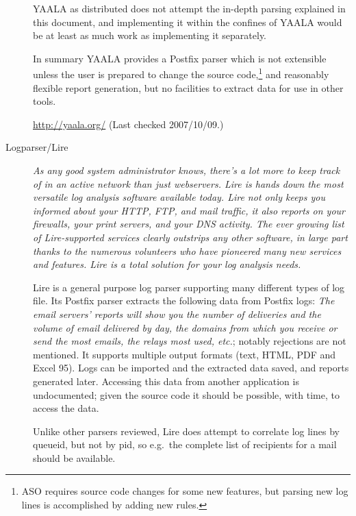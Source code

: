 \documentclass[a4paper,12pt,draft]{article}
\newcommand{\parsername}{ASO}
\begin{document}
\begin{description}
        YAALA as distributed does not attempt the in-depth parsing
        explained in this document, and implementing it within the confines
        of YAALA would be at least as much work as implementing it
        separately.

        In summary YAALA provides a Postfix parser which is not extensible
        unless the user is prepared to change the source
        code,\footnote{\parsername{} requires source code changes for some
        new features, but parsing new log lines is accomplished by adding
        new rules.} and reasonably flexible report generation, but no
        facilities to extract data for use in other tools.

        \url{http://yaala.org/} \newline (Last checked 2007/10/09.)

    \item [Logparser/Lire] \textit{As any good system administrator knows,
        there's a lot more to keep track of in an active network than just
        webservers. Lire is hands down the most versatile log analysis
        software available today. Lire not only keeps you informed about
        your HTTP, FTP, and mail traffic, it also reports on your
        firewalls, your print servers, and your DNS activity. The ever
        growing list of Lire-supported services clearly outstrips any other
        software, in large part thanks to the numerous volunteers who have
        pioneered many new services and features. Lire is a total solution
        for your log analysis needs.\/}

        Lire is a general purpose log parser supporting many different
        types of log file.  Its Postfix parser extracts the following data
        from Postfix logs: \textit{The email servers' reports will show you
        the number of deliveries and the volume of email delivered by day,
        the domains from which you receive or send the most emails, the
        relays most used, etc.\/}; notably rejections are not mentioned.
        It supports multiple output formats (text, HTML, PDF and Excel 95).
        Logs can be imported and the extracted data saved, and reports
        generated later.  Accessing this data from another application is
        undocumented; given the source code it should be possible, with
        time, to access the data.

        Unlike other parsers reviewed, Lire does attempt to correlate log
        lines by queueid, but not by pid, so e.g.\ the complete list of
        recipients for a mail should be available.


\end{description}
\end{document}

